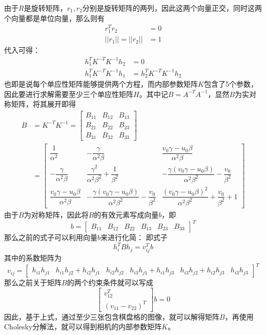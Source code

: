 由于\(R\)是旋转矩阵，\(r_1, r_2\)分别是旋转矩阵的两列，因此这两个向量正交，同时这两个向量都是单位向量，那么则有
\begin{align}
    r_1^Tr_2&=0 \\
||r_1||=||r_2||&=1
\end{align}
代入可得：
\begin{align}
    h_1^TK^{-T}K^{-1}h_2&=0 \\
h_1^TK^{-T}K^{-1}h_1 &= h_2^TK^{-T}K^{-1}h_2
\end{align}
也即是说每个单应性矩阵能够提供两个方程，而内部参数矩阵\(K\)包含了5个参数，因此要进行求解需要至少三个单应性矩阵\(H\)。其中记\(B = A^{-T}A^{-1}\)，显然\(B\)为实对称矩阵，将其展开即得
\begin{align}
    B &=K^{-T}K^{-1}=
\left[
\begin{array}{ccc}
B_{11} & B_{12} & B_{13} \\
B_{21} & B_{22} & B_{23} \\
B_{31} & B_{32} & B_{33}
\end{array}
\right] \\ &=
\left[
\begin{array}{ccc}
\dfrac{1}{\alpha^2} & -\dfrac{\gamma}{\alpha^2\beta} & \dfrac{v_0\gamma-u_0\beta}{\alpha^2\beta} \\
-\dfrac{\gamma}{\alpha^2\beta} & \dfrac{\gamma^2}{\alpha^2\beta^2}+\dfrac{1}{\beta^2} & -\dfrac{\gamma(v_0\gamma-u_0\beta)}{\alpha^2\beta^2}-\dfrac{v_0}{\beta^2} \\
\dfrac{v_0\gamma-u_0\beta}{\alpha^2\beta} & -\dfrac{\gamma(v_0\gamma-u_0\beta)}{\alpha^2\beta^2}-\dfrac{v_0}{\beta^2} & \dfrac{(v_0\gamma-u_0\beta)^2}{\alpha^2\beta^2}+\dfrac{v_0}{\beta^2}+1
\end{array}
\right]
\end{align}
由于\(B\)为对称矩阵，因此将\(B\)的有效元素写成向量\(b\)，即
\begin{equation}
b=\left[ \begin{array}{cccccc} B_{11} & B_{12} & B_{22} & B_{13} & B_{23} & B_{33} \end{array} \right]^T
\end{equation}
那么之前的式子可以利用向量\(b\)来进行化简：
即式子
\begin{equation}
    h_i^TBh_j = v^T_{ij}b
\end{equation}
其中的系数矩阵为
\begin{equation}
    v_{ij}=\left[ \begin{array}{cccccc} h_{i1}h_{j1} & h_{i1}h_{j2}+h_{i2}h_{j1} & h_{i2}h_{j2} & h_{i3}h_{j1}+h_{i1}h_{j3} & h_{i3}h_{j2}+h_{i2}h_{j3} & h_{i3}h_{j3} \end{array} \right]^T
\end{equation}
那么之前关于矩阵\(B\)的两个约束条件就可以写成
\begin{equation}
    \left[ \begin{array}{c} v^T_{12} \\ (v_{11}-v_{22})^T \end{array} \right]b=0
\end{equation}
因此，基于上式，通过至少三张包含棋盘格的图像，就可以解得矩阵\(B\)，再使用Cholesky分解法，就可以得到相机的内部参数矩阵\(K\)。

